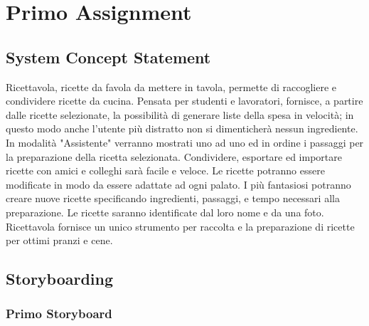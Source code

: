 

\section{Primo Assignment}



\subsection{System Concept Statement}

Ricettavola, ricette da favola da mettere in tavola, permette di raccogliere e condividere ricette da cucina.
Pensata per studenti e lavoratori, fornisce, a partire dalle ricette selezionate, la possibilità di generare liste della spesa in velocità;
in questo modo anche l'utente più distratto non si dimenticherà nessun ingrediente.
In modalità "Assistente" verranno mostrati uno ad uno ed in ordine i passaggi per la preparazione della ricetta selezionata.
Condividere, esportare ed importare ricette con amici e colleghi sarà facile e veloce.
Le ricette potranno essere modificate in modo da essere adattate ad ogni palato.
I più fantasiosi potranno creare nuove ricette specificando ingredienti, passaggi, e tempo necessari alla preparazione.
Le ricette saranno identificate dal loro nome e da una foto.
Ricettavola fornisce un unico strumento per raccolta e la preparazione di ricette per ottimi pranzi e cene.







\subsection{Storyboarding}
\subsubsection{Primo Storyboard}

